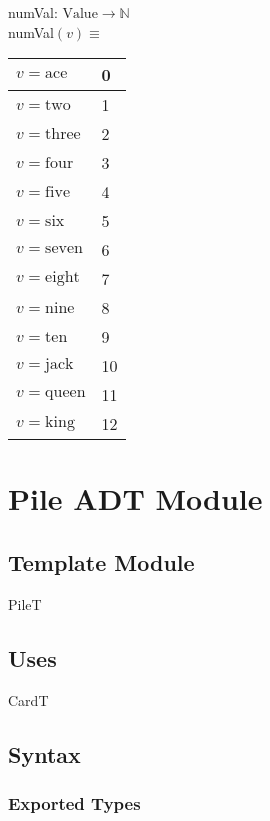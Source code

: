 \documentclass[12pt]{article}
\begin{document}
numVal: $\mbox{Value} \rightarrow \mbox{$\mathbb{N}$}$\\

\noindent numVal$(v) \equiv$

\medskip

\begin{tabular}{|l|l|}
\hline
$v = \mbox{ace}$ & 0\\
\hline
$v = \mbox{two}$ & 1\\
\hline
$v = \mbox{three}$ & 2\\
\hline
$v = \mbox{four}$ & 3\\
\hline
$v = \mbox{five}$ & 4\\
\hline
$v = \mbox{six}$ & 5\\
\hline
$v = \mbox{seven}$ & 6\\
\hline
$v = \mbox{eight}$ & 7\\
\hline
$v = \mbox{nine}$ & 8\\
\hline
$v = \mbox{ten}$ & 9\\
\hline
$v = \mbox{jack}$ & 10\\
\hline
$v = \mbox{queen}$ & 11\\
\hline
$v = \mbox{king}$ & 12\\
\hline
\end{tabular}

\newpage

\section* {Pile ADT Module}

\subsection*{Template Module}

PileT

\subsection* {Uses}

CardT

\subsection* {Syntax}

\subsubsection* {Exported Types}
\end{document}

